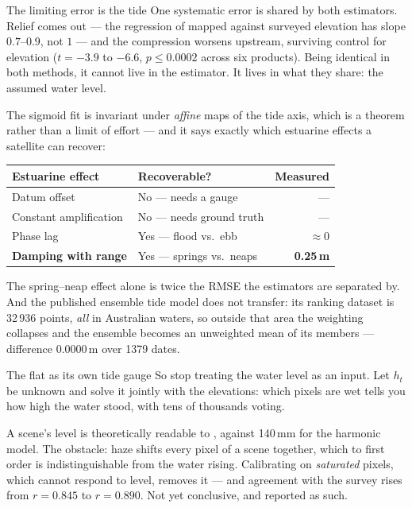 \begin{pblock}{The limiting error is the tide}
One systematic error is shared by both estimators. Relief comes out
 — the regression of mapped against surveyed elevation has
slope $0.7$--$0.9$, not $1$ — and the compression worsens
 upstream, surviving control for
elevation ($t=-3.9$ to $-6.6$, $p\le0.0002$ across six products). Being
identical in both methods, it cannot live in the estimator. It lives in what
they share: the assumed water level.

\vspace{3mm}
The sigmoid fit is invariant under \emph{affine} maps of the tide axis, which
is a theorem rather than a limit of effort — and it says exactly which
estuarine effects a satellite can recover:

\vspace{2mm}
\begin{tabular}{@{}l l r@{}}
\toprule
Estuarine effect & Recoverable? & Measured \\
\midrule
Datum offset            & No — needs a gauge      & --- \\
Constant amplification  & No — needs ground truth & --- \\
Phase lag               & Yes — flood vs.\ ebb    & $\approx0$ \\
\textbf{Damping with range} & Yes — springs vs.\ neaps & \textbf{0.25\,m} \\
\bottomrule
\end{tabular}

\vspace{3mm}
The spring--neap effect alone is twice the RMSE the estimators are separated
by. And the published ensemble tide model does not transfer: its ranking
dataset is 32\,936 points, \emph{all} in Australian waters, so outside that
area the weighting collapses and the ensemble becomes an unweighted mean of
its members — difference 0.0000\,m over 1379 dates.
\end{pblock}

\begin{pblock}{The flat as its own tide gauge \wip}
So stop treating the water level as an input. Let $h_t$ be unknown and solve
it jointly with the elevations: which pixels are wet tells you how high the
water stood, with tens of thousands voting.

\vspace{2mm}

\vspace{2mm}
A scene's level is theoretically readable to , against 140\,mm
for the harmonic model. The obstacle: haze shifts every pixel of a scene
together, which to first order is indistinguishable from the water rising.
Calibrating on \emph{saturated} pixels, which cannot respond to level, removes
it — and agreement with the survey rises from $r=0.845$ to $r=0.890$. Not yet
conclusive, and reported as such.
\end{pblock}
